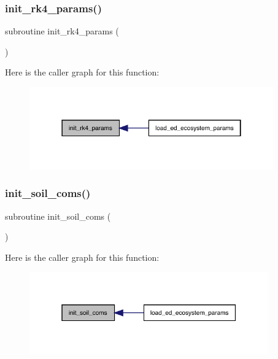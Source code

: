 \subsubsection{\texorpdfstring{init\+\_\+rk4\+\_\+params()}{init\_rk4\_params()}}
{\footnotesize\ttfamily subroutine init\+\_\+rk4\+\_\+params (\begin{DoxyParamCaption}{ }\end{DoxyParamCaption})}

Here is the caller graph for this function\+:
\nopagebreak
\begin{figure}[H]
\begin{center}
\leavevmode
\includegraphics[width=298pt]{ed__params_8f90_a3ef1627f6aff0ad10ca705f74d615bf7_icgraph}
\end{center}
\end{figure}
\mbox{\label{ed__params_8f90_a5cc44cea82dec9d24909807b46b4d165}} 
\subsubsection{\texorpdfstring{init\+\_\+soil\+\_\+coms()}{init\_soil\_coms()}}
{\footnotesize\ttfamily subroutine init\+\_\+soil\+\_\+coms (\begin{DoxyParamCaption}{ }\end{DoxyParamCaption})}

Here is the caller graph for this function\+:
\nopagebreak
\begin{figure}[H]
\begin{center}
\leavevmode
\includegraphics[width=292pt]{ed__params_8f90_a5cc44cea82dec9d24909807b46b4d165_icgraph}
\end{center}
\end{figure}
\mbox{\label{ed__params_8f90_af74bdb1b6959fc9b59288f80e8832f14}} 
